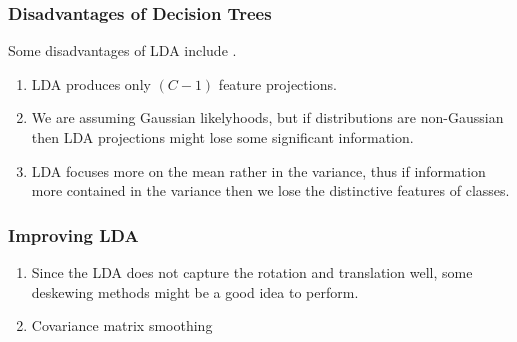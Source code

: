 \subsubsection{Disadvantages of Decision Trees}

Some disadvantages of LDA include \cite{notes:dislda}.
%
\begin{enumerate}
	\item LDA produces only $(C-1)$ feature projections. 
	\item We are assuming Gaussian likelyhoods, but if distributions are non-Gaussian then LDA projections might lose some significant information.
	\item LDA focuses more on the mean rather in the variance, thus if information more contained in the variance then we lose the distinctive features of classes.
\end{enumerate}

\subsubsection{Improving LDA}

\begin{enumerate}
	\item Since the LDA does not capture the rotation and translation well, some deskewing methods might be a good idea to perform.
	\item Covariance matrix smoothing 
	
\end{enumerate}	